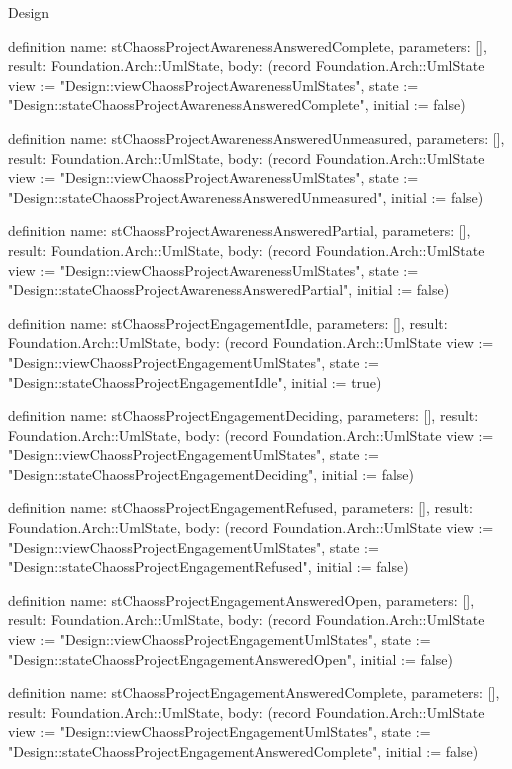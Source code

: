 \begin{lexlean}{Design}
\begin{semanticmodule}
definition{
  name: stChaossProjectAwarenessAnsweredComplete,
  parameters: [],
  result: Foundation.Arch::UmlState,
  body: (record Foundation.Arch::UmlState {view := "Design::viewChaossProjectAwarenessUmlStates", state := "Design::stateChaossProjectAwarenessAnsweredComplete", initial := false})
}

definition{
  name: stChaossProjectAwarenessAnsweredUnmeasured,
  parameters: [],
  result: Foundation.Arch::UmlState,
  body: (record Foundation.Arch::UmlState {view := "Design::viewChaossProjectAwarenessUmlStates", state := "Design::stateChaossProjectAwarenessAnsweredUnmeasured", initial := false})
}

definition{
  name: stChaossProjectAwarenessAnsweredPartial,
  parameters: [],
  result: Foundation.Arch::UmlState,
  body: (record Foundation.Arch::UmlState {view := "Design::viewChaossProjectAwarenessUmlStates", state := "Design::stateChaossProjectAwarenessAnsweredPartial", initial := false})
}

definition{
  name: stChaossProjectEngagementIdle,
  parameters: [],
  result: Foundation.Arch::UmlState,
  body: (record Foundation.Arch::UmlState {view := "Design::viewChaossProjectEngagementUmlStates", state := "Design::stateChaossProjectEngagementIdle", initial := true})
}

definition{
  name: stChaossProjectEngagementDeciding,
  parameters: [],
  result: Foundation.Arch::UmlState,
  body: (record Foundation.Arch::UmlState {view := "Design::viewChaossProjectEngagementUmlStates", state := "Design::stateChaossProjectEngagementDeciding", initial := false})
}

definition{
  name: stChaossProjectEngagementRefused,
  parameters: [],
  result: Foundation.Arch::UmlState,
  body: (record Foundation.Arch::UmlState {view := "Design::viewChaossProjectEngagementUmlStates", state := "Design::stateChaossProjectEngagementRefused", initial := false})
}

definition{
  name: stChaossProjectEngagementAnsweredOpen,
  parameters: [],
  result: Foundation.Arch::UmlState,
  body: (record Foundation.Arch::UmlState {view := "Design::viewChaossProjectEngagementUmlStates", state := "Design::stateChaossProjectEngagementAnsweredOpen", initial := false})
}

definition{
  name: stChaossProjectEngagementAnsweredComplete,
  parameters: [],
  result: Foundation.Arch::UmlState,
  body: (record Foundation.Arch::UmlState {view := "Design::viewChaossProjectEngagementUmlStates", state := "Design::stateChaossProjectEngagementAnsweredComplete", initial := false})
}


\end{semanticmodule}
\end{lexlean}
